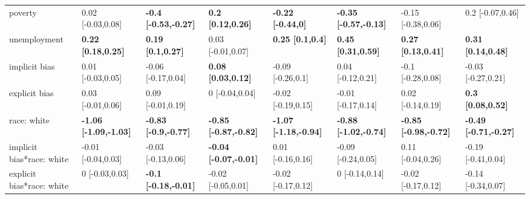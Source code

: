 \documentclass[]{article}
\theoremstyle{definition}
\theoremstyle{definition}
\theoremstyle{remark}
\begin{document}
\begin{landscape}
\begin{table}
{\begin{tabular}[t]{llllllll}
poverty & 0.02 [-0.03,0.08] & \textbf{-0.4 [-0.53,-0.27]} & \textbf{0.2 [0.12,0.26]} & \textbf{-0.22 [-0.44,0]} & \textbf{-0.35 [-0.57,-0.13]} & -0.15 [-0.38,0.06] & 0.2 [-0.07,0.46]\\
unemployment & \textbf{0.22 [0.18,0.25]} & \textbf{0.19 [0.1,0.27]} & 0.03 [-0.01,0.07] & \textbf{0.25 [0.1,0.4]} & \textbf{0.45 [0.31,0.59]} & \textbf{0.27 [0.13,0.41]} & \textbf{0.31 [0.14,0.48]}\\
implicit bias & 0.01 [-0.03,0.05] & -0.06 [-0.17,0.04] & \textbf{0.08 [0.03,0.12]} & -0.09 [-0.26,0.1] & 0.04 [-0.12,0.21] & -0.1 [-0.28,0.08] & -0.03 [-0.27,0.21]\\
\addlinespace
explicit bias & 0.03 [-0.01,0.06] & 0.09 [-0.01,0.19] & 0 [-0.04,0.04] & -0.02 [-0.19,0.15] & -0.01 [-0.17,0.14] & 0.02 [-0.14,0.19] & \textbf{0.3 [0.08,0.52]}\\
race: white & \textbf{-1.06 [-1.09,-1.03]} & \textbf{-0.83 [-0.9,-0.77]} & \textbf{-0.85 [-0.87,-0.82]} & \textbf{-1.07 [-1.18,-0.94]} & \textbf{-0.88 [-1.02,-0.74]} & \textbf{-0.85 [-0.98,-0.72]} & \textbf{-0.49 [-0.71,-0.27]}\\
implicit bias*race: white & -0.01 [-0.04,0.03] & -0.03 [-0.13,0.06] & \textbf{-0.04 [-0.07,-0.01]} & 0.01 [-0.16,0.16] & -0.09 [-0.24,0.05] & 0.11 [-0.04,0.26] & -0.19 [-0.41,0.04]\\
explicit bias*race: white & 0 [-0.03,0.03] & \textbf{-0.1 [-0.18,-0.01]} & -0.02 [-0.05,0.01] & -0.02 [-0.17,0.12] & 0 [-0.14,0.14] & -0.02 [-0.17,0.12] & -0.14 [-0.34,0.07]\\
\bottomrule
\end{tabular}}
\end{table}
\end{landscape}
\end{document}
